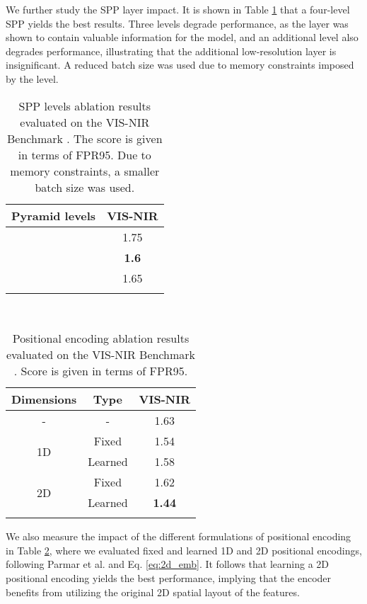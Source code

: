 \documentclass[10pt,journal]{IEEEtran}\usepackage{amsfonts}
\begin{document}
We further study the SPP layer impact. It is shown in Table \ref {table:spp_ablation} that a four-level SPP yields the best results. Three
levels degrade performance, as the  layer was shown to contain
valuable information for the model, and an additional level also degrades
performance, illustrating that the additional low-resolution layer is
insignificant. A reduced batch size was used due to memory constraints
imposed by the  level.
\begin{table}[tbh]
\centering
\begin{tabular}{cc}
\toprule Pyramid levels & VIS-NIR \\
\midrule  & 1.75 \\
 & \textbf{1.6} \\
 & 1.65 \\
\bottomrule &
\end{tabular}\caption{SPP levels ablation results evaluated on the VIS-NIR Benchmark
\protect\cite{SiameseCrossSpectral}. The score is given in terms of FPR95.
Due to memory constraints, a smaller batch size was used.}
\label{table:spp_ablation}
\end{table}
\begin{table}[tbh]
\centering
{\setlength{\tabcolsep}{3pt} }
\par
{\
\begin{tabular}{ccc}
\toprule Dimensions & Type & VIS-NIR \\
\midrule - & - & 1.63 \\
\multirow{ 2}{*}{1D} & Fixed & 1.54 \\
& Learned & 1.58 \\
\multirow{ 2}{*}{2D} & Fixed & 1.62 \\
& Learned & \textbf{1.44} \\
\bottomrule &  &
\end{tabular}}
\caption{Positional encoding ablation results evaluated on the VIS-NIR
Benchmark \protect\cite{SiameseCrossSpectral}. Score is given in terms of
FPR95.}
\label{table:ablation_pos}
\end{table}

We also measure the impact of the different formulations of positional
encoding in Table \ref{table:ablation_pos}, where we evaluated fixed and
learned 1D and 2D positional encodings, following Parmar et al. \cite {ImageTransformer} and Eq. \ref{eq:2d_emb}. It follows that learning a 2D
positional encoding yields the best performance, implying that the encoder
benefits from utilizing the original 2D spatial layout of the features.
\end{document}
